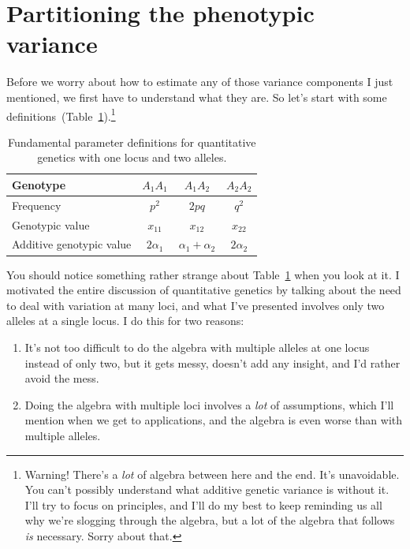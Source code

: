\documentclass[12pt]{article}
\begin{document}
\section*{Partitioning the phenotypic variance}

Before we worry about how to estimate any of those variance components
I just mentioned, we first have to understand what they are. So let's
start with some
definitions~(Table~\ref{table:definitions}).\footnote{Warning! There's
  a {\it lot\/} of algebra between here and the end. It's
  unavoidable. You can't possibly understand what additive genetic
  variance is without it. I'll try to focus on principles, and I'll do
  my best to keep reminding us all why we're slogging through the
  algebra, but a lot of the algebra that follows {\it is\/}
  necessary. Sorry about that.}

\begin{table}
\begin{center}
\begin{tabular}{l|ccc}
\hline\hline
Genotype                 & $A_1A_1$    & $A_1A_2$ & $A_2A_2$ \\
\hline
Frequency                & $p^2$       & $2pq$    & $q^2$ \\
Genotypic value          & $x_{11}$    & $x_{12}$ & $x_{22}$ \\
Additive genotypic value & $2\alpha_1$ & $\alpha_1 + \alpha_2$ 
                                                  & $2\alpha_2$ \\
\hline
\end{tabular}
\end{center}
\caption{Fundamental parameter definitions for quantitative genetics
  with one locus and two alleles.}\label{table:definitions}
\end{table}

You should notice something rather strange about
Table~\ref{table:definitions} when you look at it. I motivated the
entire discussion of quantitative genetics by talking about the need
to deal with variation at many loci, and what I've presented involves
only two alleles at a single locus. I do this for two reasons:

\begin{enumerate}

\item It's not too difficult to do the algebra with multiple alleles
  at one locus instead of only two, but it gets messy, doesn't add any
  insight, and I'd rather avoid the mess.

\item Doing the algebra with multiple loci involves a {\it lot\/} of
  assumptions, which I'll mention when we get to applications, and the
  algebra is even worse than with multiple alleles.

\end{enumerate}
\end{document}
